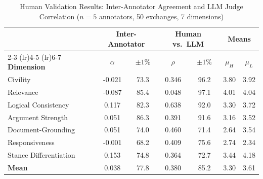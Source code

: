 \begin{table}[htbp]
\centering
\caption{Human Validation Results: Inter-Annotator Agreement and LLM Judge Correlation ($n=5$ annotators, 50 exchanges, 7 dimensions)}
\label{tab:human-validation}
\small
\begin{tabular}{l cc cc cc}
\toprule
& \multicolumn{2}{c}{\textbf{Inter-Annotator}} & \multicolumn{2}{c}{\textbf{Human vs.\ LLM}} & \multicolumn{2}{c}{\textbf{Means}} \\
\cmidrule(lr){2-3} \cmidrule(lr){4-5} \cmidrule(lr){6-7}
\textbf{Dimension} & $\alpha$ & $\pm 1$\% & $\rho$ & $\pm 1$\% & $\mu_H$ & $\mu_L$ \\
\midrule
Civility & -0.021 & 73.3 & 0.346 & 96.2 & 3.80 & 3.92 \\
Relevance & -0.087 & 85.4 & 0.048 & 97.1 & 4.01 & 4.04 \\
Logical Consistency & 0.117 & 82.3 & 0.638 & 92.0 & 3.30 & 3.72 \\
Argument Strength & 0.051 & 86.3 & 0.391 & 91.6 & 3.16 & 3.52 \\
Document-Grounding & 0.051 & 74.0 & 0.460 & 71.4 & 2.64 & 3.54 \\
Responsiveness & -0.001 & 68.2 & 0.409 & 75.6 & 2.74 & 2.34 \\
Stance Differentiation & 0.153 & 74.8 & 0.364 & 72.7 & 3.44 & 4.18 \\
\midrule
\textbf{Mean} & 0.038 & 77.8 & 0.380 & 85.2 & 3.30 & 3.61 \\
\bottomrule
\end{tabular}
\end{table}